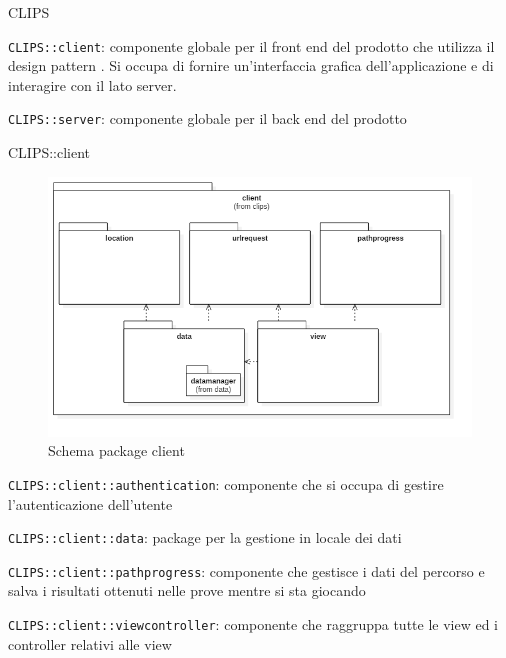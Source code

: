 \begin{componente}{CLIPS}
\begin{compPackageContenuti}
\item \texttt{CLIPS::client}: componente globale per il front end del prodotto che utilizza il design pattern . Si occupa di fornire un'interfaccia grafica dell'applicazione e di interagire con il lato server.
\item \texttt{CLIPS::server}: componente globale per il back end del prodotto
\end{compPackageContenuti}
\end{componente}
\begin{componente}{CLIPS::client}
\begin{figure}[h!]
\centering
\includegraphics[scale=0.4]{img/package/png/client.png}
\caption{Schema package client}
 \end{figure}
\begin{compPackageContenuti}
\item \texttt{CLIPS::client::authentication}: componente che si occupa di gestire l'autenticazione dell'utente
\item \texttt{CLIPS::client::data}: package per la gestione in locale dei dati
\item \texttt{CLIPS::client::pathprogress}: componente che gestisce i dati del percorso e salva i risultati ottenuti nelle prove mentre si sta giocando
\item \texttt{CLIPS::client::viewcontroller}: componente che raggruppa tutte le view ed i controller relativi alle view
\end{compPackageContenuti}
\end{componente}
